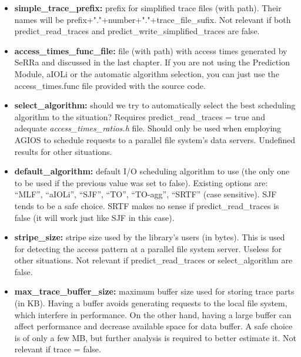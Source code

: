 \begin{itemize}
\item \textbf{simple\_trace\_prefix:} prefix for simplified trace files (with path). Their names will be prefix+"."+number+"."+trace\_file\_sufix. Not relevant if both predict\_read\_traces and predict\_write\_simplified\_traces are false.
\item \textbf{access\_times\_func\_file:} file (with path) with access times generated by SeRRa and discussed in the last chapter. If you are not using the Prediction Module, aIOLi or the automatic algorithm selection, you can just use the access\_times.func file provided with the source code.
\item \textbf{select\_algorithm:} should we try to automatically select the best scheduling algorithm to the situation? Requires predict\_read\_traces = true and adequate \emph{access\_times\_ratios.h} file. Should only be used when employing AGIOS to schedule requests to a parallel file system's data servers. Undefined results for other situations.
\item \textbf{default\_algorithm:} default I/O scheduling algorithm to use (the only one to be used if the previous value was set to false). Existing options are: ``MLF'', ``aIOLi'', ``SJF'', ``TO'', ``TO-agg'', ``SRTF'' (case sensitive). SJF tends to be a safe choice. SRTF makes no sense if predict\_read\_traces is false (it will work just like SJF in this case).
\item \textbf{stripe\_size:} stripe size used by the library's users (in bytes). This is used for detecting the access pattern at a parallel file system server. Useless for other situations. Not relevant if predict\_read\_traces or select\_algorithm are false.
\item \textbf{max\_trace\_buffer\_size:} maximum buffer size used for storing trace parts (in KB). Having a buffer avoids generating requests to the local file system, which interfere in performance. On the other hand, having a large buffer can affect performance and decrease available space for data buffer. A safe choice is of only a few MB, but further analysis is required to better estimate it. Not relevant if trace = false.
\end{itemize}
